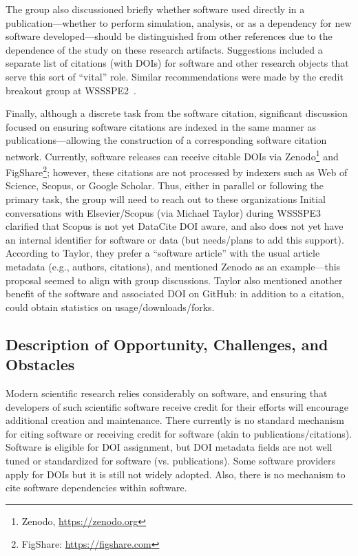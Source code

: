 The group also discussioned briefly whether software used directly in 
a publication---whether to perform simulation, analysis, or as a dependency 
for new software developed---should be distinguished from other references 
due to the dependence of the study on these research artifacts.
Suggestions included a separate list of citations (with DOIs) for software 
and other research objects that serve this sort of ``vital'' role.
Similar recommendations were made by the credit breakout group at 
WSSSPE2~\cite{WSSSPE2}.

Finally, although a discrete task from the software citation, significant 
discussion focused on ensuring software citations are indexed in the same 
manner as publications---allowing the construction of a corresponding 
software citation network.
Currently, software releases can receive citable DOIs via 
Zenodo\footnote{Zenodo, \url{https://zenodo.org}} and 
FigShare\footnote{FigShare: \url{https://figshare.com}}; however, these 
citations are not processed by indexers such as Web of Science, Scopus, 
or Google Scholar.
Thus, either in parallel or following the primary task, the group will 
need to reach out to these organizations 
Initial conversations with Elsevier\slash Scopus (via Michael Taylor) 
during WSSSPE3 clarified that Scopus is not yet DataCite DOI aware, and 
also does not yet have an internal identifier for software or data (but 
needs\slash plans to add this support).
According to Taylor, they prefer a ``software article'' with the usual 
article metadata (e.g., authors, citations), and mentioned Zenodo as an 
example---this proposal seemed to align with group discussions.
Taylor also mentioned another benefit of the software and associated DOI 
on GitHub: in addition to a citation, could obtain statistics on 
usage/downloads/forks.

\subsection{Description of Opportunity, Challenges, and Obstacles}

Modern scientific research relies considerably on software, and ensuring 
that developers of such scientific software receive credit for their efforts 
will encourage additional creation and maintenance.
There currently is no standard mechanism for citing software or receiving credit for software (akin to publications/citations).
Software is eligible for DOI assignment, but DOI metadata fields are not well tuned or standardized for software (vs. publications).
Some software providers apply for DOIs but it is still not widely adopted.
Also, there is no mechanism to cite software dependencies within software.

